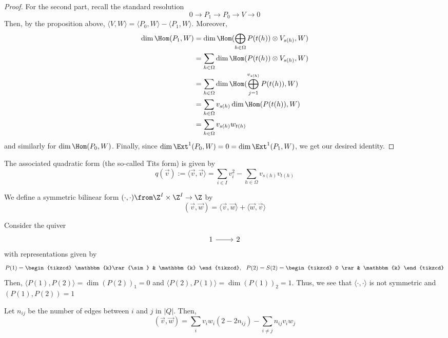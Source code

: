 \documentclass[11pt,leqno,oneside]{amsbook}
\numberwithin{thm}{section}
\newcommand{\bbk}{\mathbbm{k}} %
\renewcommand{\Q}{Q} %
\begin{document}
\begin{proof}
  For the second part, recall the standard resolution \[
    0 \to P_1 \to P_0 \to V \to 0
  \]
  Then, by the proposition above, \(\langle V,W \rangle = \langle P_0,
  W\rangle - \langle P_1, W \rangle\). Moreover,
  \begin{align*}
    \dim\Hom(P_1,W)
    & = \dim \Hom(\bigoplus_{h \in \Omega} P(t(h)) \otimes V_{s(h)},W) \\
    & = \sum_{h \in \Omega} \dim \Hom(P(t(h)) \otimes V_{s(h)},W) \\
    & = \sum_{h \in \Omega} \dim \Hom(\bigoplus_{j=1}^{v_{s(h)}}
      P(t(h)), W) \\
    & = \sum_{h \in \Omega} v_{s(h)} \dim \Hom(P(t(h)),W) \\
    & = \sum_{h \in \Omega} v_{s(h)} w_{t(h)}
  \end{align*}
  and similarly for \(\dim\Hom(P_0,W)\). Finally, since \(\dim
  \Ext^1(P_0,W) = 0 = \dim \Ext^1(P_1,W)\), we get our desired
  identity. 
\end{proof}
\begin{defn}
  The associated quadratic form (the so-called Tits form) is given
  by \[
    q(\vec{v}) := \langle \vec{v}, \vec{v} \rangle = \sum_{i \in I}
    v_i^2 - \sum_{h \in \Omega} v_{s(h)} v_{t(h)}
  \]
\end{defn}
\begin{defn}
  We define a symmetric bilinear form \((\cdot, \cdot) \from \Z^I
  \times \Z^I \to \Z\) by \[
    (\vec{v}, \vec{w}) = \langle \vec{v}, \vec{w} \rangle + \langle
    \vec{w}, \vec{v} \rangle
  \]
\end{defn}
\begin{example}
  Consider the quiver \[
    \begin{tikzcd}
      1 \rar & 2
    \end{tikzcd}
  \]
  with representations given by \[
    P(1) = \begin{tikzcd}
      \bbk \rar{\sim} & \bbk
    \end{tikzcd}, \ \ P(2) = S(2) = 
    \begin{tikzcd}
      0 \rar & \bbk
    \end{tikzcd}
  \]
  Then, \(\langle P(1), P(2) \rangle = \dim (P(2))_1 = 0\) and
  \(\langle P(2), P(1) \rangle = \dim (P(1))_2 = 1\). Thus, we see
  that \(\langle \cdot, \cdot \rangle\) is not symmetric and 
  \((P(1),P(2)) = 1\)
\end{example}
\begin{thm}
  Let \(n_{ij}\) be the number of edges between \(i\) and \(j\) in
  \(|\Q|\). Then, \[
    (\vec{v}, \vec{w}) = \sum_i v_i w_i (2-2n_{ij}) - \sum_{i \neq j}
    n_{ij} v_i w_j
  \]
\end{thm}
\end{document}
